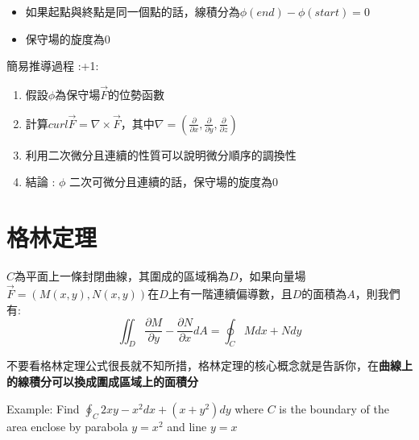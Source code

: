 \documentclass[
]{book}
\providecommand{\tightlist}{%
  \setlength{\itemsep}{0pt}\setlength{\parskip}{0pt}}
\begin{document}
\begin{itemize}
\tightlist
\item
  如果起點與終點是同一個點的話，線積分為\(\phi(end) - \phi(start) = 0\)
\item
  保守場的旋度為0
\end{itemize}

簡易推導過程 :+1:

\begin{enumerate}
\def\labelenumi{\arabic{enumi}.}
\tightlist
\item
  假設\(\phi\)為保守場\(\vec F\)的位勢函數
\item
  計算\(curl \vec F = \nabla \times \vec F\)，其中\(\nabla = (\frac{\partial}{\partial x},\frac{\partial}{\partial y},\frac{\partial}{\partial z})\)
\item
  利用二次微分且連續的性質可以說明微分順序的調換性
\item
  結論 : \(\phi\) 二次可微分且連續的話，保守場的旋度為0
\end{enumerate}

\hypertarget{ux683cux6797ux5b9aux7406}{%
\section{格林定理}\label{ux683cux6797ux5b9aux7406}}

\(C\)為平面上一條封閉曲線，其圍成的區域稱為\(D\)，如果向量場\(\vec F = (M(x,y),N(x,y))\)在\(D\)上有一階連續偏導數，且\(D\)的面積為\(A\)，則我們有:
\[\iint_D\frac{\partial M}{\partial y}-\frac{\partial N}{\partial x}dA = \oint_CMdx+Ndy\]

不要看格林定理公式很長就不知所措，格林定理的核心概念就是告訴你，在\textbf{曲線上的線積分可以換成圍成區域上的面積分}

Example: Find \(\oint_C 2xy-x^2dx+(x+y^2)dy\) where \(C\) is the boundary of the area enclose by parabola \(y = x^2\) and line \(y = x\)

  
\end{document}

